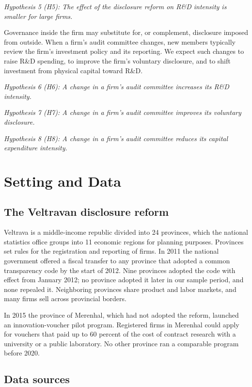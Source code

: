 \documentclass[12pt]{article}
\begin{document}
\textit{Hypothesis 5 (H5): The effect of the disclosure reform on R\&D intensity is smaller for large firms.}

Governance inside the firm may substitute for, or complement, disclosure imposed from outside. When a firm's audit committee changes, new members typically review the firm's investment policy and its reporting. We expect such changes to raise R\&D spending, to improve the firm's voluntary disclosure, and to shift investment from physical capital toward R\&D.

\textit{Hypothesis 6 (H6): A change in a firm's audit committee increases its R\&D intensity.}

\textit{Hypothesis 7 (H7): A change in a firm's audit committee improves its voluntary disclosure.}

\textit{Hypothesis 8 (H8): A change in a firm's audit committee reduces its capital expenditure intensity.}

\section{Setting and Data}

\subsection{The Veltravan disclosure reform}

Veltrava is a middle-income republic divided into 24 provinces, which the national statistics office groups into 11 economic regions for planning purposes. Provinces set rules for the registration and reporting of firms. In 2011 the national government offered a fiscal transfer to any province that adopted a common transparency code by the start of 2012. Nine provinces adopted the code with effect from January 2012; no province adopted it later in our sample period, and none repealed it. Neighboring provinces share product and labor markets, and many firms sell across provincial borders.

In 2015 the province of Merenhal, which had not adopted the reform, launched an innovation-voucher pilot program. Registered firms in Merenhal could apply for vouchers that paid up to 60 percent of the cost of contract research with a university or a public laboratory. No other province ran a comparable program before 2020.

\subsection{Data sources}
\end{document}
